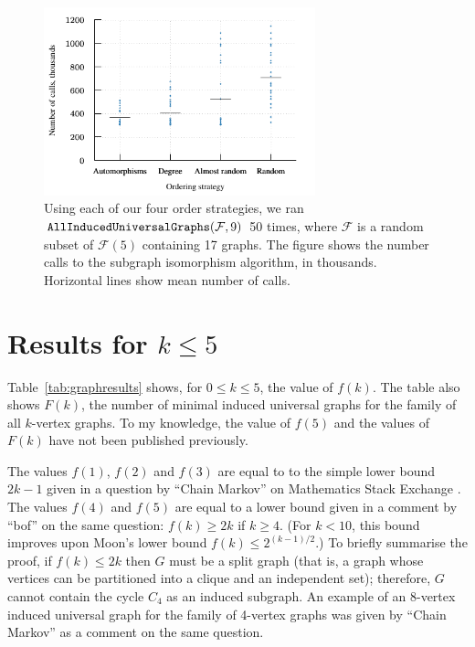 \documentclass[12pt]{article}
\newcommand{\calF}{\ensuremath{\mathcal{F}}}
\begin{document}
\begin{figure}[htb]
    \centering

    \includegraphics*[width=0.7\textwidth]{img/second-experiment-plot-using-sample}

    \caption{Using each of our four order strategies, we ran
        $\FuncSty{AllInducedUniversalGraphs}(\calF,9)$ 50 times, where
        $\calF$ is a random subset of $\calF(5)$ containing 17 graphs. The figure
        shows the number calls to the subgraph isomorphism algorithm, in thousands.
        Horizontal lines show mean number of calls.}
\label{fig:second-experiment-using-sample}
\end{figure}

\section{Results for \texorpdfstring{$k \leq 5$}{k<=5}}\label{sec:results5}

Table~\ref{tab:graphresults} shows, for $0 \leq k \leq 5$, the value of $f(k)$.
The table also shows $F(k)$, the number of minimal induced universal
graphs for the family of all $k$-vertex graphs.  To my knowledge, the value of
$f(5)$ and the values of $F(k)$ have not been published previously.

The values $f(1)$, $f(2)$ and $f(3)$ are equal to to the simple lower bound $2k
- 1$ given in a question by ``Chain Markov'' on Mathematics Stack Exchange
  \cite{math_se_question}.  The values $f(4)$ and $f(5)$ are equal to a lower
  bound given in a comment by ``bof'' on the same question: $f(k) \geq 2k$ if $k
  \geq 4$.  (For $k < 10$, this bound improves upon Moon's lower bound $f(k)
  \leq 2^{(k-1)/2}$.) To briefly summarise the proof, if $f(k) \leq 2k$ then $G$
  must be a split graph (that is, a graph whose vertices can be partitioned
  into a clique and an independent set); therefore, $G$ cannot contain the
  cycle $C_4$ as an induced subgraph.  An example of an 8-vertex induced
  universal graph for the family of 4-vertex graphs was given by ``Chain
  Markov'' as a comment on the same question.
\end{document}
